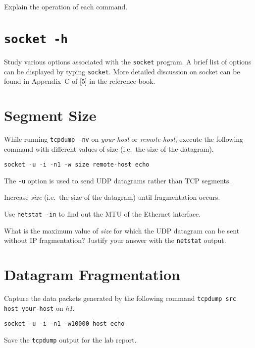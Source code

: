 \documentclass{../UTNetLab}
\begin{document}
    \begin{report}
        \item Explain the operation of each command.
    \end{report}

\section{\texttt{socket -h}}
    Study various options associated with the \lstinline{socket} program.
    A brief list of options can be displayed by typing \lstinline{socket}.
    More detailed discussion on socket can be found in
    Appendix~C of [5] in the reference book.

\section{Segment Size}
    While running \lstinline{tcpdump -nv} on \textit{your-host} or \textit{remote-host}, execute the following command with different values of size (i.e.\  the size of the datagram).

    \begin{lstlisting}[emph={size, remote-host},morekeywords={[3]echo}]
socket -u -i -n1 -w size remote-host echo
    \end{lstlisting}
    
    The \lstinline{-u} option is used to send UDP datagrams rather than TCP segments.

    Increase \textit{size} (i.e.\  the size of the datagram) until fragmentation occurs.

    Use \lstinline{netstat -in} to find out the MTU of the Ethernet interface.

    \begin{report}
        \item What is the maximum value of \textit{size} for which the UDP datagram can be sent without IP fragmentation?
            Justify your answer with the \lstinline{netstat} output.
    \end{report}

\section{Datagram Fragmentation}
    Capture the data packets generated by the following command \lstinline[emph={your-host, remote-host},morekeywords={[3]src,host}]{tcpdump src host your-host} on \textit{h1}.

    \begin{lstlisting}[emph={host},morekeywords={[3]echo}]
socket -u -i -n1 -w10000 host echo
    \end{lstlisting}
    Save the \lstinline{tcpdump} output for the lab report.
    
\end{document}
